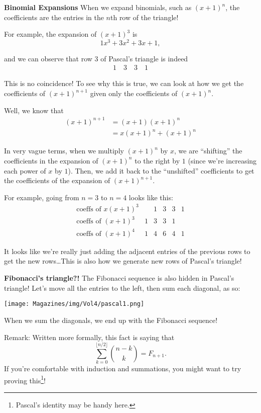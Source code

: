 \documentclass{article}
\begin{document}
\begin{multicols}{3}
\textbf{Binomial Expansions}
When we expand binomials, such as $(x+1)^n$, the coefficients are the entries in the $n$th row of the triangle! 

For example, the expansion of $(x+1)^3$ is 
\[1x^3+3x^2+3x+1,\]

and we can observe that row $3$ of Pascal's triangle is indeed 
\[
	\begin{array}{c}1\quad3\quad3\quad1\end{array}
\]

This is no coincidence! To see why this is true, we can look at how we get the coefficients of $(x+1)^{n+1}$ given only the coefficients of $(x+1)^n$.

Well, we know that
\begin{align*}
	(x+1)^{n+1}&=(x+1)(x+1)^n \\
			   &= x(x+1)^n+(x+1)^n
\end{align*}

In very vague terms, when we multiply $(x+1)^n$ by $x$, we are ``shifting'' the coefficients in the expansion of $(x+1)^n$ to the right by $1$ (since we're increasing each power of $x$ by $1$). Then, we add it back to the ``unshifted'' coefficients to get the coefficients of the expansion of $(x+1)^{n+1}$. 

For example, going from $n=3$ to $n=4$ looks like this:
\[
\begin{array}{c|ccccc}
\text{coeffs of } x(x+1)^3 & &1&3&3&1 \\
\text{coeffs of } (x+1)^3 & 1&3&3&1& \\
\hline
\text{coeffs of } (x+1)^4 & 1&4&6&4&1
\end{array}
\]

It looks like we're really just adding the adjacent entries of the previous rows to get the new rows\dots This is also how we generate new rows of Pascal's triangle! 

\textbf{Fibonacci's triangle?!}
The Fibonacci sequence is also hidden in Pascal's triangle! Let's move all the entries to the left, then sum each diagonal, as so:

\begin{center}
	\texttt{[image: Magazines/img/Vol4/pascal1.png]}
\end{center}

When we sum the diagonals, we end up with the Fibonacci sequence! 

Remark: Written more formally, this fact is saying that
\[\sum_{k=0}^{\lfloor n/2\rfloor}\binom{n-k}k=F_{n+1}.\]
If you're comfortable with induction and summations, you might want to try proving this\footnote{Pascal's identity may be handy here.}!



\end{multicols}
\end{document}
